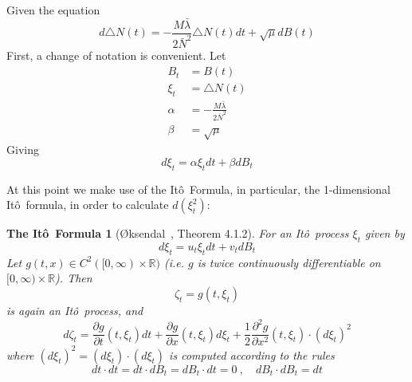 \documentclass[titlepage]{article}
\newcommand{\Ito}{It\^{o}~}
\newtheorem*{itoform}{The \Ito Formula}
\begin{document}
Given the equation
\begin{equation*}
d \triangle N(t) =
-\frac{M\bar\lambda}{2\bar{N}^2} \triangle N(t)dt + \sqrt{\mu}dB(t)
\end{equation*}
First, a change of notation is convenient.
Let
\begin{align*}
B_t &= B(t) \\
\xi_t &= \triangle N(t) \\
\alpha &= -\frac{M\bar\lambda}{2\bar{N}^2} \\
\beta &= \sqrt{\mu}
\end{align*}
Giving
\begin{equation*}
d \xi_t = \alpha \xi_t dt + \beta dB_t
\end{equation*}

At this point we make use of the \Ito Formula, in particular, the 1-dimensional \Ito formula, in order to calculate $d(\xi_t^2)$:
\begin{itoform}[{\O}ksendal~\cite{oksendal}, Theorem 4.1.2]
For an \Ito process $\xi_t$ given by
\begin{equation*}
d \xi_t = u_t \xi_t dt + v_t dB_t
\end{equation*}
Let $g(t,x) \in C^2([0,\infty) \times \mathbb{R})$ (i.e. $g$ is twice continuously differentiable on $[0,\infty) \times \mathbb{R}$). Then
\begin{equation*}
\zeta_t = g(t,\xi_t)
\end{equation*}
is again an \Ito process, and
\begin{equation*}
d\zeta_t = \frac{\partial g}{\partial t}(t,\xi_t)dt + \frac{\partial g}{\partial x}(t, \xi_t)d\xi_t + \frac{1}{2}\frac{\partial^2 g}{\partial x^2}(t,\xi_t) \cdotp (d\xi_t)^2
\end{equation*}
where $(d\xi_t)^2 = (d\xi_t) \cdotp (d\xi_t)$ is computed according to the rules
\begin{equation*}
dt \cdotp dt = dt \cdotp dB_t = dB_t \cdotp dt = 0~, \quad dB_t \cdot dB_t = dt
\end{equation*}
\end{itoform}
\end{document}
